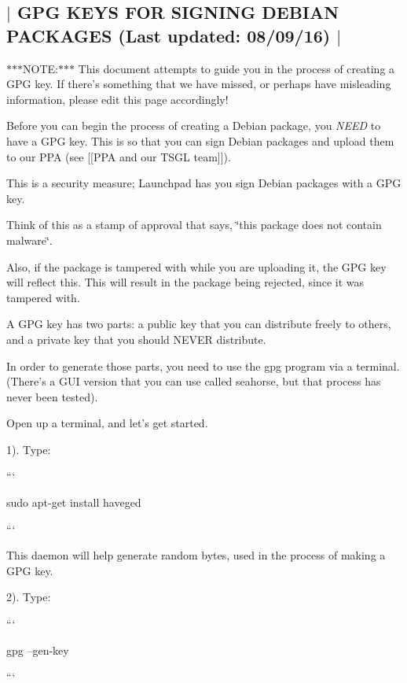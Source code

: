 

 \subsection*{$\vert$ G\-P\-G K\-E\-Y\-S F\-O\-R S\-I\-G\-N\-I\-N\-G D\-E\-B\-I\-A\-N P\-A\-C\-K\-A\-G\-E\-S (Last updated\-: 08/09/16) $\vert$ }

$\ast$$\ast$$\ast$\-N\-O\-T\-E\-:$\ast$$\ast$$\ast$ This document attempts to guide you in the process of creating a G\-P\-G key. If there's something that we have missed, or perhaps have misleading information, please edit this page accordingly!

Before you can begin the process of creating a Debian package, you {\itshape N\-E\-E\-D} to have a G\-P\-G key. This is so that you can sign Debian packages and upload them to our P\-P\-A (see \mbox{[}\mbox{[}P\-P\-A and our T\-S\-G\-L team\mbox{]}\mbox{]}).

This is a security measure; Launchpad has you sign Debian packages with a G\-P\-G key.

Think of this as a stamp of approval that says, \char`\"{}this package does not contain malware\char`\"{}.

Also, if the package is tampered with while you are uploading it, the G\-P\-G key will reflect this. This will result in the package being rejected, since it was tampered with.

A G\-P\-G key has two parts\-: a public key that you can distribute freely to others, and a private key that you should N\-E\-V\-E\-R distribute.

In order to generate those parts, you need to use the {\ttfamily gpg} program via a terminal. (There's a G\-U\-I version that you can use called {\ttfamily seahorse}, but that process has never been tested).

Open up a terminal, and let's get started.

1). Type\-:

``` \begin{DoxyVerb}sudo apt-get install haveged
\end{DoxyVerb}


```

This daemon will help generate random bytes, used in the process of making a G\-P\-G key.

2). Type\-:

```

gpg --gen-\/key

```

